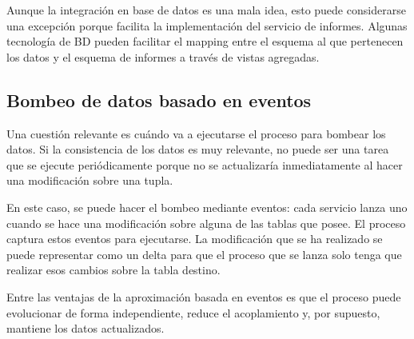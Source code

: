 \documentclass[11pt,a4paper]{article}
\begin{document}
Aunque la integración en base de datos es una mala idea, esto puede considerarse una excepción porque facilita la implementación del servicio de informes. Algunas tecnología de BD pueden facilitar el mapping entre el esquema al que pertenecen los datos y el esquema de informes a través de vistas agregadas.

\subsection{Bombeo de datos basado en eventos}

Una cuestión relevante es cuándo va a ejecutarse el proceso para bombear los datos. Si la consistencia de los datos es muy relevante, no puede ser una tarea que se ejecute periódicamente porque no se actualizaría inmediatamente al hacer una modificación sobre una tupla. 

En este caso, se puede hacer el bombeo mediante eventos: cada servicio lanza uno cuando se hace una modificación sobre alguna de las tablas que posee. El proceso captura estos eventos para ejecutarse. La modificación que se ha realizado se puede representar como un delta para que el proceso que se lanza solo tenga que realizar esos cambios sobre la tabla destino. 

Entre las ventajas de la aproximación basada en eventos es que el proceso puede evolucionar de forma independiente, reduce el acoplamiento y, por supuesto, mantiene los datos actualizados.
\end{document}
